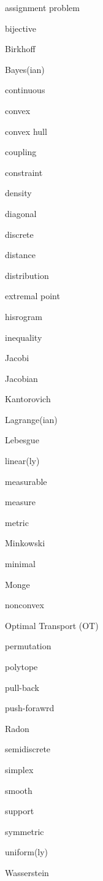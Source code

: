 \documentclass[cn,10pt,math=newtx,citestyle=gb7714-2015,bibstyle=gb7714-2015]{elegantbook}
\begin{document}
\begin{minipage}[b]{0.24\textwidth}

assignment problem

bijective

Birkhoff

Bayes(ian)

continuous

convex

convex hull

coupling

constraint

density

diagonal

discrete

distance

distribution

extremal point

hisrogram

inequality

Jacobi

Jacobian

Kantorovich

Lagrange(ian)

Lebesgue

linear(ly)

measurable

measure

metric

Minkowski

minimal

Monge

nonconvex

Optimal Transport (OT)

permutation

polytope

pull-back

push-forawrd

Radon

semidiscrete

simplex

smooth

support

symmetric

uniform(ly)

Wasserstein

\end{minipage}
\end{document}
